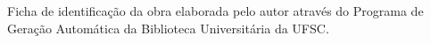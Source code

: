 \thispagestyle{empty}
\mbox{}
\vfill
\begin{center}

Ficha de identificação da obra elaborada pelo autor
através do Programa de Geração Automática da Biblioteca Universitária da UFSC.
\end{center}
\vfill
\mbox{}

\cleardoublepageempty
